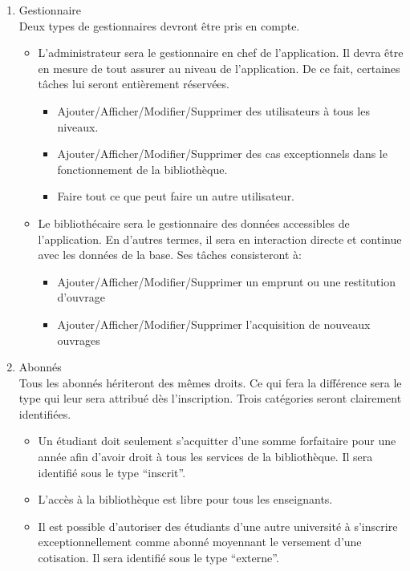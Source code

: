 \begin{enumerate}
    \item Gestionnaire
\\ Deux types de gestionnaires devront être pris en compte.
    \begin{itemize}
        \item L'administrateur sera le gestionnaire en chef
    de l'application. Il devra être en mesure de tout assurer
    au niveau de l'application. De ce fait, certaines tâches
    lui seront entièrement réservées.
        \begin{itemize}
            \item Ajouter/Afficher/Modifier/Supprimer des 
            utilisateurs à tous les niveaux.
            \item Ajouter/Afficher/Modifier/Supprimer des 
            cas exceptionnels dans le fonctionnement de la 
            bibliothèque.
            \item Faire tout ce que peut faire un autre utilisateur.
        \end{itemize}
        \item Le bibliothécaire sera le gestionnaire des 
    données accessibles de l’application. En d’autres termes, 
    il sera en interaction directe et continue avec les données 
    de la base. Ses tâches consisteront à:
        \begin{itemize}
            \item Ajouter/Afficher/Modifier/Supprimer un emprunt 
            ou une restitution  d’ouvrage
            \item Ajouter/Afficher/Modifier/Supprimer l’acquisition 
            de nouveaux ouvrages
        \end{itemize}
    \end{itemize}

    \item Abonnés
\\ Tous les abonnés hériteront des mêmes droits. Ce qui fera la 
différence sera le type qui leur sera attribué dès 
l’inscription. Trois catégories seront clairement 
identifiées.
    \begin{itemize}
    \item Un étudiant doit seulement s’acquitter d’une somme 
    forfaitaire pour une année afin d’avoir droit à tous les 
    services de la bibliothèque. Il sera identifié sous le type “inscrit”.
    \item L’accès à la bibliothèque est libre pour tous les enseignants.
    \item Il est possible d’autoriser des étudiants d’une autre université à 
    s’inscrire exceptionnellement comme abonné moyennant le versement d’une 
    cotisation. Il sera identifié sous le type “externe”.
    \end{itemize}
\end{enumerate}
